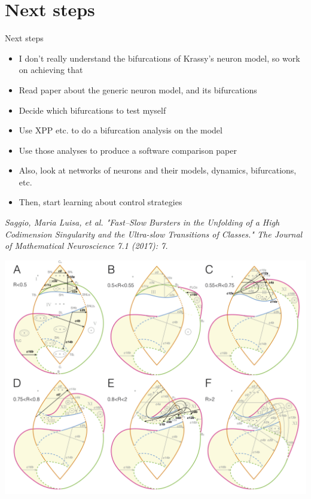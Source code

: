\documentclass{beamer}
\begin{document}
\section{Next steps}
\label{sec:org675a7bb}
\begin{frame}[label={sec:orgf2e9416}]{Next steps}
\begin{itemize}
\item I don't really understand the bifurcations of Krassy's neuron model, so work on achieving that
\item Read paper about the generic neuron model, and its bifurcations
\item Decide which bifurcations to test myself
\item Use XPP etc. to do a bifurcation analysis on the model
\item Use those analyses to produce a software comparison paper
\item Also, look at networks of neurons and their models, dynamics, bifurcations, etc.
\item Then, start learning about control strategies
\end{itemize}

\emph{Saggio, Maria Luisa, et al. "Fast–Slow Bursters in the Unfolding of a High Codimension Singularity and the Ultra-slow Transitions of Classes." The Journal of Mathematical Neuroscience 7.1 (2017): 7.}


\end{frame}
\begin{frame}[plain]
\begin{center}
\includegraphics[height=1.3\textheight]{hardbif.png}
\end{center}
\end{frame}
\end{document}
